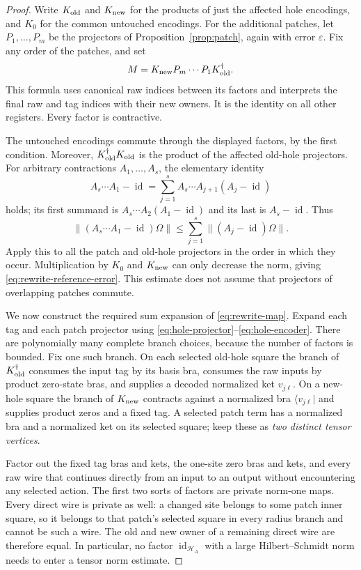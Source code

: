 \documentclass[11pt]{article}
\numberwithin{equation}{section}
\theoremstyle{definition}
\theoremstyle{remark}
\DeclareMathOperator{\id}{id}
\newcommand{\norm}[1]{\lVert #1\rVert}
\begin{document}
\begin{proof}
Write $K_{\rm old}$ and $K_{\rm new}$ for the products of just the affected
hole encodings, and $K_0$ for the common untouched encodings.  For the
additional patches, let $P_1,\ldots,P_m$ be the projectors of
Proposition~\ref{prop:patch}, again with error $\varepsilon$.  Fix any order
of the patches, and set
\begin{equation}\label{eq:rewrite-map}
 M=K_{\rm new}P_m\cdots P_1K_{\rm old}^{\dagger}.
\end{equation}
This formula uses canonical raw indices between its factors and interprets
the final raw and tag indices with their new owners.  It is the identity on
all other registers.  Every factor is contractive.

The untouched encodings commute through the displayed factors, by the
first condition.  Moreover,
$K_{\rm old}^{\dagger}K_{\rm old}$ is the product of the affected old-hole
projectors.  For arbitrary contractions $A_1,\ldots,A_s$, the elementary
identity
\[
 A_s\cdots A_1-\id
  =\sum_{j=1}^s A_s\cdots A_{j+1}(A_j-\id)
\]
holds; its first summand is $A_s\cdots A_2(A_1-\id)$ and its last is
$A_s-\id$.  Thus
\[
 \norm{(A_s\cdots A_1-\id)\Omega}
      \le\sum_{j=1}^s\norm{(A_j-\id)\Omega}.
\]
Apply this to all the patch and old-hole projectors in the order in which
they occur.  Multiplication by $K_0$ and $K_{\rm new}$ can only decrease
the norm, giving \eqref{eq:rewrite-reference-error}.  This estimate does not
assume that projectors of overlapping patches commute.

We now construct the required sum expansion of \eqref{eq:rewrite-map}.
Expand each tag and each patch projector using
\eqref{eq:hole-projector}--\eqref{eq:hole-encoder}.  There are polynomially
many complete branch choices, because the number of factors is bounded.
Fix one such branch.  On each selected old-hole square the branch of
$K_{\rm old}^{\dagger}$ consumes the input tag by its basis bra, consumes
the raw inputs by product zero-state bras, and supplies a decoded normalized
ket $v_{j\ell}$.  On a new-hole square the branch of $K_{\rm new}$ contracts
against a normalized bra $\langle v_{j\ell}|$ and supplies product zeros
and a fixed tag.  A selected patch term has a normalized bra and a
normalized ket on its selected square; keep these as \emph{two distinct
tensor vertices}.

Factor out the fixed tag bras and kets, the one-site zero bras and kets, and
every raw wire that continues directly from an input to an output without
encountering any selected action.  The first two sorts of factors are
private norm-one maps.  Every direct wire is private as well: a changed
site belongs to some patch inner square, so it belongs to that patch's
selected square in every radius branch and cannot be such a wire.  The
old and new owner of a remaining direct wire are therefore equal.  In
particular, no factor $\id_{\mathcal H_A}$ with a large Hilbert--Schmidt
norm needs to enter a tensor norm estimate.


\end{proof}
\end{document}
